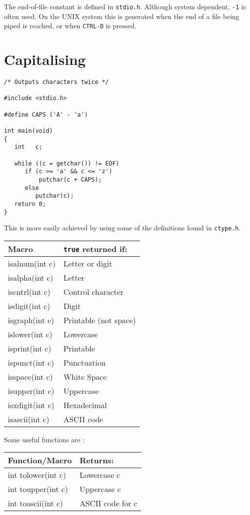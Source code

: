 The end-of-file constant is defined in {\tt stdio.h}. Although
system dependent, {\tt -1} is often used. On the UNIX system
this is generated when the end of a file being piped is reached,
or when {\tt CTRL-D} is pressed.

\section*{Capitalising}

\begin{verbatim}
/* Outputs characters twice */

#include <stdio.h>

#define CAPS ('A' - 'a')

int main(void)
{
   int   c;

   while ((c = getchar()) != EOF)
      if (c >= 'a' && c <= 'z')
          putchar(c + CAPS);
      else
         putchar(c);
   return 0;
}
\end{verbatim}

\newpage
This is more easily achieved by using some of
the definitions found in {\tt ctype.h}.

\begin{center}
\begin{tabular}{|l|l|} \hline
Macro        & {\tt true} returned if: \\ \hline
isalnum(int c) & Letter or digit \\
isalpha(int c) & Letter \\
iscntrl(int c) & Control character \\
isdigit(int c) & Digit \\
isgraph(int c) & Printable (not space) \\
islower(int c) & Lowercase\\
isprint(int c) & Printable\\
ispunct(int c) & Punctuation\\
isspace(int c) & White Space\\
isupper(int c) & Uppercase\\
isxdigit(int c)& Hexadecimal\\
isascii(int c) & ASCII code \\ \hline
\end{tabular}
\end{center}


Some useful functions are :

\begin{center}
\begin{tabular}{|l|l|} \hline
Function/Macro & Returns: \\ \hline
int tolower(int c) & Lowercase c \\
int toupper(int c) & Uppercase c \\
int toascii(int c) & ASCII code for c \\ \hline
\end{tabular}
\end{center}


